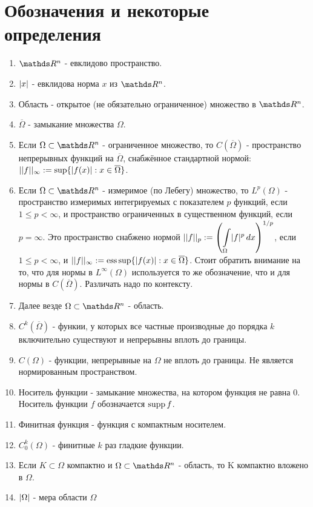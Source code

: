 \section*{Обозначения и некоторые определения}
\begin{enumerate}
\item $\real^n$ - евклидово пространство.
\item $\lvert x\rvert$ - евклидова норма $x$ из $\real^n$.
\item Область - открытое (не обязательно ограниченное) множество в $\real^n$.
\item $\overline{\Omega}$ - замыкание множества $\Omega$.
\item Если $\Omega \subset \real^n$ - ограниченное множество, то $C(\overline{\Omega})$ - пространство непрерывных функций на $\overline{\Omega}$, снабжённое стандартной нормой: $||f||_{\infty} := \sup \{ \lvert f(x)\rvert : x \in \overline{\Omega} \}$.
\item Если $\Omega \subset \real^n$ - измеримое (по Лебегу) множество, то $L^p (\Omega)$ - пространство измеримых интегрируемых с показателем $p$ функций, если $1 \leq p < \infty$, и пространство ограниченных в существенном функций, если $p = \infty$. Это пространство снабжено нормой $||f||_p := \left( \displaystyle \int \limits_{\Omega} \lvert f\rvert^p \,dx \right)^{1/p}$, если $1 \leq p < \infty$, и $||f||_{\infty} := \operatorname{ess\,sup} \{ \lvert f(x)\rvert : x \in \overline{\Omega} \}$. Стоит обратить внимание на то, что для нормы в $L^{\infty}(\Omega)$ используется то же обозначение, что и для нормы в $C(\overline{\Omega})$. Различать надо по контексту.
\item Далее везде $\Omega \subset \real^n$ - область. 
\item $C^k(\overline{\Omega})$ - функии, у которых все частные производные до порядка $k$ включительно существуют и непрерывны вплоть до границы.
\item $C(\Omega)$ - функции, непрерывные на $\Omega$ не вплоть до границы. Не является нормированным пространством.
\item Носитель функции - замыкание множества, на котором функция не равна $0$. Носитель функции $f$ обозначается $\operatorname{supp} f$.
\item Финитная функция - функция с компактным носителем.
\item $C^k_0(\Omega)$ - финитные $k$ раз гладкие  функции.
\item Если $K \subset \Omega$ компактно и $\Omega \subset \real^n$ - область, то K компактно вложено в $\Omega$.
\item $\lvert\Omega\rvert$ - мера области $\Omega$

\end{enumerate}

